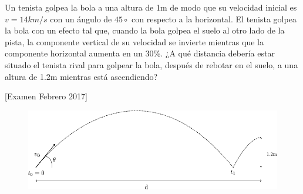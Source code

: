 \begin{ex}
    Un tenista golpea la bola a una altura de 1m de modo que su velocidad inicial es $v = 14 km/s$ con un ángulo de $45\circ$ con respecto a la horizontal. El tenista golpea la bola con un efecto tal que, cuando la bola golpea el suelo al otro lado de la pista, la componente vertical de su velocidad se invierte mientras que la componente horizontal aumenta en un 30\%. ¿A qué distancia debería estar situado el tenista rival para golpear la bola, después de rebotar en el suelo, a una altura de 1.2m mientras está ascendiendo?

    [Examen Febrero 2017]
\end{ex}

\begin{figure}
    \centering
    \includegraphics[scale=0.7]{figures/F2017.pdf}
\end{figure}

